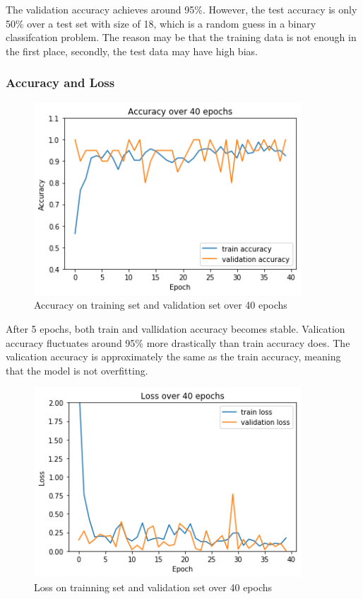 \documentclass[a4paper,12pt]{article}
\begin{document}
The validation accuracy achieves around 95\%. 
However, the test accuracy is only 50\% over a test set with size of 18, 
which is a random guess in a binary classifcation problem. 
The reason may be that the training data is not enough in the first place, 
secondly, the test data may have high bias.

\subsubsection{Accuracy and Loss}
\begin{figure}[H]
  \centering
  \includegraphics[width=10cm]{./images/task1-accuracy.png}
     \caption{Accuracy on training set and validation set over 40 epochs}
        \label{task1-accuracy}
\end{figure}

After 5 epochs, both train and vallidation accuracy becomes stable. 
Valication accuracy fluctuates around 95\% more drastically than train accuracy does.
The valication accuracy is approximately the same as the train accuracy, 
meaning that the model is not overfitting.

\begin{figure}[H]
  \centering
  \includegraphics[width=10cm]{./images/task1-loss.png}
     \caption{Loss on trainning set and validation set over 40 epochs}
        \label{task1-loss}
\end{figure}
\end{document}
